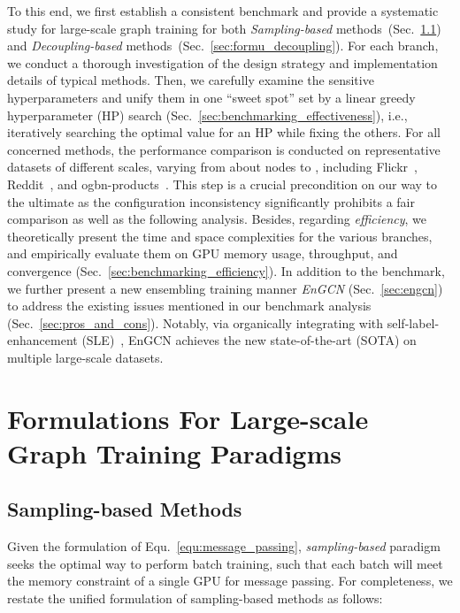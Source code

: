 \message{ !name(main.tex)}\documentclass{article}
\begin{document}
To this end, we first establish a consistent benchmark and provide a systematic study for large-scale graph training for both \textit{Sampling-based} methods~(Sec.~\ref{sec:formu_sampling}) and \textit{Decoupling-based} methods~(Sec.~\ref{sec:formu_decoupling}). For each branch, we conduct a thorough investigation of the design strategy and implementation details of typical methods. Then, we carefully examine the sensitive hyperparameters and unify them in one ``sweet spot'' set by a linear greedy hyperparameter (HP) search (Sec.~\ref{sec:benchmarking_effectiveness}), i.e., iteratively searching the optimal value for an HP while fixing the others. For all concerned methods, the performance comparison is conducted on representative datasets of different scales, varying from about  nodes to , including Flickr~\citep{zeng2019graphsaint}, Reddit~\citep{hamilton2017inductive}, and ogbn-products~\citep{hu2020open}. This step is a crucial precondition on our way to the ultimate as the configuration inconsistency significantly prohibits a fair comparison as well as the following analysis. Besides, regarding \textit{efficiency}, we theoretically present the time and space complexities for the various branches, and empirically evaluate them on GPU memory usage, throughput, and convergence (Sec.~\ref{sec:benchmarking_efficiency}). In addition to the benchmark, we further present a new ensembling training manner \textit{EnGCN} (Sec.~\ref{sec:engcn}) to address the existing issues mentioned in our benchmark analysis (Sec.~\ref{sec:pros_and_cons}). Notably, via organically integrating with self-label-enhancement (SLE)~\cite{sun2021scalable}, EnGCN achieves the new state-of-the-art (SOTA) on multiple large-scale datasets.

\vspace{-1mm}
\section{Formulations For Large-scale Graph Training Paradigms}\label{sec:formulation}
\vspace{-2mm}
\subsection{Sampling-based Methods}\label{sec:formu_sampling}
\vspace{-2mm}
Given the formulation of Equ.~\eqref{equ:message_passing}, \textit{sampling-based} paradigm seeks the optimal way to perform batch training, such that each batch will meet the memory constraint of a single GPU for message passing. For completeness, we restate the unified formulation of sampling-based methods as follows:
\end{document}
